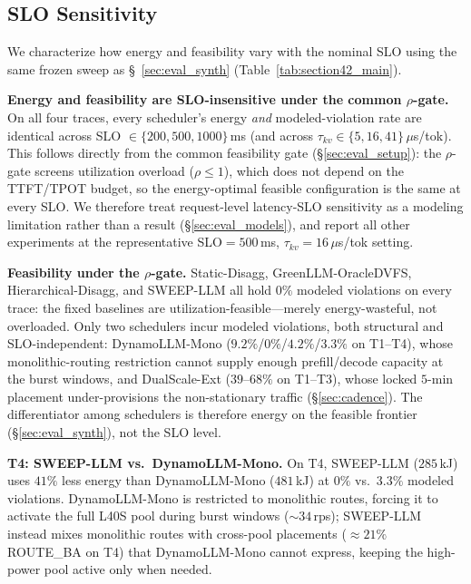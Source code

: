 \fi  %

\iffalse
\subsection{SLO Sensitivity}
\label{sec:eval_slo}

We characterize how energy and feasibility vary with the nominal SLO using the same frozen sweep as \S~\ref{sec:eval_synth} (Table~\ref{tab:section42_main}).

\textbf{Energy and feasibility are SLO-insensitive under the common $\rho$-gate.}
On all four traces, every scheduler's energy \emph{and} modeled-violation rate are identical across SLO $\in\{200,500,1000\}$\,ms (and across $\tau_{kv}\in\{5,16,41\}\,\mu$s/tok).
This follows directly from the common feasibility gate (\S\ref{sec:eval_setup}): the $\rho$-gate screens utilization overload ($\rho{\leq}1$), which does not depend on the TTFT/TPOT budget, so the energy-optimal feasible configuration is the same at every SLO.
We therefore treat request-level latency-SLO sensitivity as a modeling limitation rather than a result (\S\ref{sec:eval_models}), and report all other experiments at the representative SLO$=500$\,ms, $\tau_{kv}{=}16\,\mu$s/tok setting.

\textbf{Feasibility under the $\rho$-gate.}
Static-Disagg, GreenLLM-OracleDVFS, Hierarchical-Disagg, and SWEEP-LLM all hold $0\%$ modeled violations on every trace: the fixed baselines are utilization-feasible---merely energy-wasteful, not overloaded.
Only two schedulers incur modeled violations, both structural and SLO-independent: DynamoLLM-Mono ($9.2\%$/$0\%$/$4.2\%$/$3.3\%$ on T1--T4), whose monolithic-routing restriction cannot supply enough prefill/decode capacity at the burst windows, and DualScale-Ext ($39$--$68\%$ on T1--T3), whose locked $5$-min placement under-provisions the non-stationary traffic (\S\ref{sec:cadence}).
The differentiator among schedulers is therefore energy on the feasible frontier (\S\ref{sec:eval_synth}), not the SLO level.

\textbf{T4: SWEEP-LLM vs.\ DynamoLLM-Mono.}
On T4, SWEEP-LLM ($285$\,kJ) uses $41\%$ less energy than DynamoLLM-Mono ($481$\,kJ) at $0\%$ vs.\ $3.3\%$ modeled violations.
DynamoLLM-Mono is restricted to monolithic routes, forcing it to activate the full L40S pool during burst windows (${\sim}34$\,rps); SWEEP-LLM instead mixes monolithic routes with cross-pool placements (${\approx}21\%$ ROUTE\_BA on T4) that DynamoLLM-Mono cannot express, keeping the high-power pool active only when needed.

